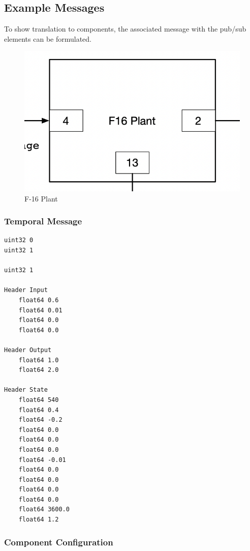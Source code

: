 \subsection{Example Messages}

To show translation to components, the associated message with the pub/sub elements can be formulated. 

\begin{figure}[h]
\centering
\includegraphics[width=0.5\linewidth]{./img/plant}
\caption{F-16 Plant}
\label{fig:f16plant}
\end{figure}

\subsubsection*{Temporal Message}

\begin{lstlisting}
uint32 0
uint32 1

uint32 1

Header Input
	float64 0.6
	float64 0.01
	float64 0.0
	float64 0.0
	
Header Output
	float64 1.0
	float64 2.0
	
Header State
	float64 540
	float64 0.4
	float64 -0.2
	float64 0.0
	float64 0.0
	float64 0.0
	float64 -0.01
	float64 0.0
	float64 0.0
	float64 0.0
	float64 0.0
	float64 3600.0
	float64 1.2
\end{lstlisting}

\subsubsection*{Component Configuration}

